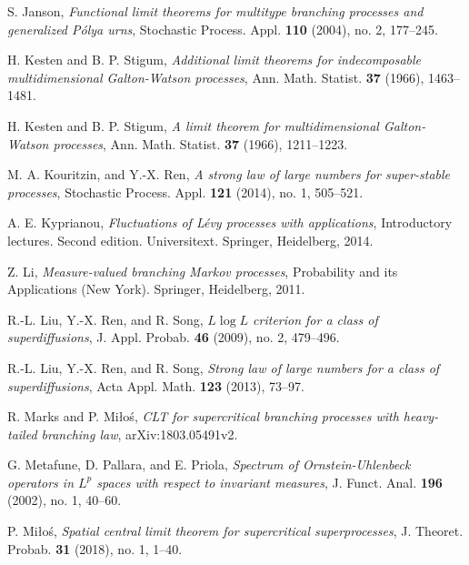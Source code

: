 \documentclass[EJP]{ejpecp} %
\begin{document}
\begin{thebibliography}{10}
  	S. Janson,
  	\emph{Functional limit theorems for multitype branching processes and generalized {P}\'{o}lya urns},
  	Stochastic Process. Appl. \textbf{110} (2004), no. 2, 177--245.

  	H. Kesten and B. P. Stigum,
  	\emph{Additional limit theorems for indecomposable multidimensional {G}alton-{W}atson processes},
  	Ann. Math. Statist. \textbf{37} (1966), 1463--1481.

  	H. Kesten and B. P. Stigum,
  	\emph{A limit theorem for multidimensional {G}alton-{W}atson processes},
  	Ann. Math. Statist. \textbf{37} (1966), 1211--1223.

  	M. A. Kouritzin, and Y.-X. Ren,
  	\emph{A strong law of large numbers for super-stable processes},
  	Stochastic Process. Appl. \textbf{121} (2014), no. 1, 505--521.

  	A. E. Kyprianou,
  	\emph{Fluctuations of {L}\'{e}vy processes with applications},
    Introductory lectures. Second edition. Universitext. Springer, Heidelberg, 2014.

  	Z. Li,
  	\emph{Measure-valued branching {M}arkov processes},
  	Probability and its Applications (New York). Springer, Heidelberg, 2011.

  	R.-L. Liu, Y.-X. Ren, and R. Song,
  	\emph{{$L\log L$} criterion for a class of superdiffusions},
  	J. Appl. Probab. \textbf{46} (2009), no. 2, 479--496.

  	R.-L. Liu, Y.-X. Ren, and R. Song,
  	\emph{Strong law of large numbers for a class of superdiffusions},
  	Acta Appl. Math. \textbf{123} (2013), 73--97.

  	R. Marks and P. Mi{\l}o{\'s},
  	\emph{C{LT} for supercritical branching processes with heavy-tailed branching law},
  	 arXiv:1803.05491v2.

  	G. Metafune, D. Pallara, and E. Priola,
  	\emph{Spectrum of {O}rnstein-{U}hlenbeck operators in {$L^p$} spaces with respect to invariant  measures},
  	J. Funct. Anal. \textbf{196} (2002), no. 1, 40--60.

  	P. Mi{\l}o{\'s},
  	\emph{Spatial central limit theorem for supercritical superprocesses},
  	J. Theoret. Probab. \textbf{31} (2018), no. 1, 1--40.


\end{thebibliography}
\end{document}
